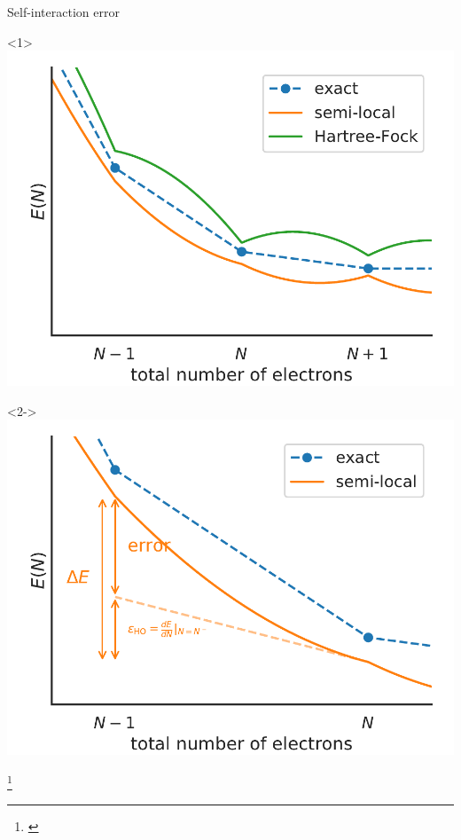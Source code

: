 \documentclass[xcolor=table,aspectratio=169]{beamer}
\newcommand\blfootcite[1]{%
  \begingroup
  \renewcommand\thefootnote{}\footnote{\hspace{-4ex}\cite{#1}}%
  \addtocounter{footnote}{-1}%
  \endgroup
}
\numberwithin{equation}{section}
\begin{document}
\begin{frame}{Self-interaction error}
   \nocite{Dabo2010,Borghi2014,Nguyen2018,Colonna2018,Colonna2019,DeGennaro2022,Colonna2022}

   \begin{overlayarea}{\textwidth}{0.7\textheight}
      \begin{center}
         \begin{onlyenv}<1>
            \includegraphics[height=0.7\textheight]{figures/curvature_plot/fig_en_curve_with_all.pdf}
         \end{onlyenv}


         \begin{onlyenv}<2->
            \includegraphics[height=0.7\textheight]{figures/curvature_plot/fig_en_curve_sl_annotated_zoom.pdf}
         \end{onlyenv}
      \end{center}

   \end{overlayarea}

   \blfootcite{Cohen2008,Li2017}

\end{frame}
\end{document}
